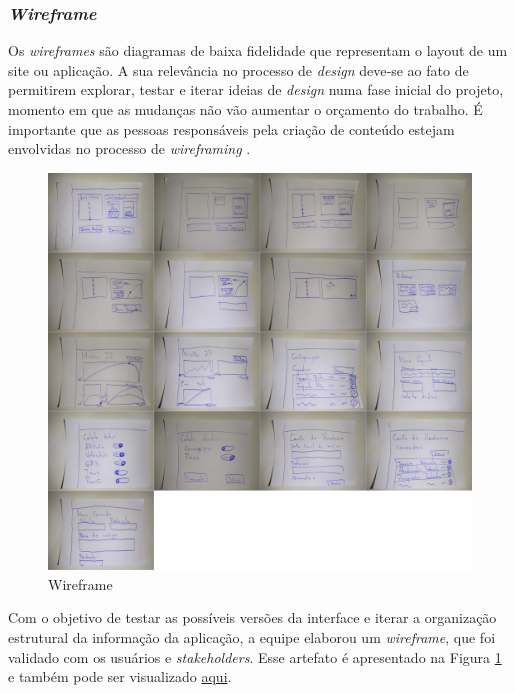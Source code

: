 \subsubsection{\textit{Wireframe}}

\par Os \textit{wireframes} são diagramas de baixa fidelidade que representam o layout de um site ou aplicação. A sua relevância no processo de \textit{design} deve‐se ao fato de permitirem explorar, testar e iterar ideias de \textit{design} numa fase inicial do projeto, momento em que as mudanças não vão aumentar o orçamento do trabalho. É importante que as pessoas responsáveis pela criação de conteúdo estejam envolvidas no processo de \textit{wireframing} \cite{brito2016usabilidade}. 

\begin{figure}[H]
\centering
\includegraphics[scale=0.21]{figuras/wireframe.png}  
\caption{Wireframe}
\label{fig:Wireframe}
\end{figure}

\par Com o objetivo de testar as possíveis versões da interface e iterar a organização estrutural da informação da aplicação, a equipe elaborou um \textit{wireframe}, que foi validado com os usuários e \textit{stakeholders}. Esse artefato é apresentado na Figura \ref{fig:Wireframe} e também pode ser visualizado \href{https://bit.ly/3jnLnmN}{aqui}.


